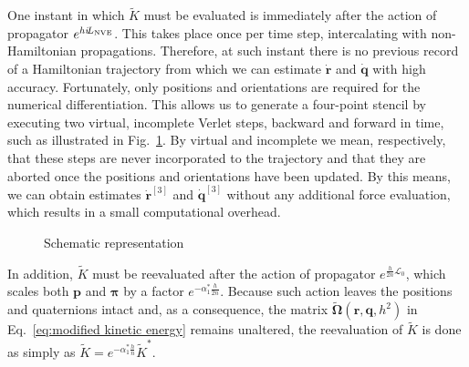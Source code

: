 \documentclass[
journal=jctcce,
layout=twocolumn
]{achemso}
\newcommand{\vt}[1]{\boldsymbol{\mathbf{#1}}}   %
\newcommand{\Liu}[1]{i\!L_\text{#1}}            %
\newcommand{\timestep}{h}
\newcommand{\refined}[1]{\widetilde{#1}}
\begin{document}
One instant in which $\refined K$ must be evaluated is immediately after the action of propagator $e^{\timestep \Liu{\tiny NVE}}$.
This takes place once per time step, intercalating with non-Hamiltonian propagations.
Therefore, at such instant there is no previous record of a Hamiltonian trajectory from which we can estimate $\dot{\vt r}$ and $\dot{\vt q}$ with high accuracy.
Fortunately, only positions and orientations are required for the numerical differentiation.
This allows us to generate a four-point stencil by executing two virtual, incomplete Verlet steps, backward and forward in time, such as illustrated in Fig.~\ref{fig:virtual steps}.
By virtual and incomplete we mean, respectively, that these steps are never incorporated to the trajectory and that they are aborted once the positions and orientations have been updated.
By this means, we can obtain estimates $\dot{\vt r}^{[3]}$ and $\dot{\vt q}^{[3]}$ without any additional force evaluation, which results in a small computational overhead.

\begin{figure}
\caption{Schematic representation}
\label{fig:virtual steps}
\end{figure}

In addition, $\refined K$ must be reevaluated after the action of propagator $e^{\frac{\timestep}{2n} {\mathcal L}_0}$, which scales both $\vt p$ and $\vt \pi$ by a factor $e^{-\alpha_1^\ast \frac{\timestep}{2n}}$.
Because such action leaves the positions and quaternions intact and, as a consequence, the matrix $\refined{\mathbf \Omega}(\vt r, \vt q, \timestep^2)$ in Eq.~\eqref{eq:modified kinetic energy} remains unaltered, the reevaluation of $\refined K$ is done as simply as ${\refined K} = e^{-\alpha_1^\ast \frac{\timestep}{n}} {\refined K}^\ast$.
\end{document}
